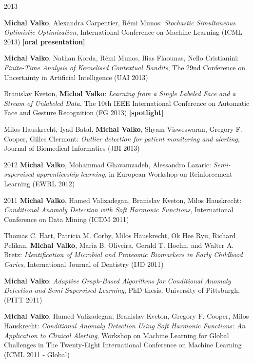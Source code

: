 \documentclass{resume}
\begin{document}
\begin{category}{2013}

\citembullet
{\bf Michal Valko}, Alexandra Carpentier, R\' emi Munos:
\emph{Stochastic Simultaneous Optimistic Optimization},
International Conference on Machine Learning
({\sf ICML 2013}) {\bf [oral presentation]}

\citembullet
{\bf Michal Valko}, Nathan Korda, R\' emi Munos, Ilias Flaounas, Nello 
Cristianini:
\emph{Finite-Time Analysis of Kernelised Contextual Bandits},
The 29nd Conference on Uncertainty in Artificial Intelligence
({\sf UAI 2013})

\citembullet
Branislav Kveton, {\bf Michal Valko}:
\emph{Learning from a Single Labeled Face and a Stream of Unlabeled Data},
The 10th IEEE International Conference on Automatic Face and Gesture Recognition
({\sf FG 2013})
{\bf [spotlight]}

\citembullet
Milos Hauskrecht, Iyad Batal, {\bf Michal Valko}, Shyam Visweswaran,
Gregory F. Cooper, Gilles Clermont: \emph{Outlier detection for patient
monitoring and alerting}, Journal of Biomedical Informatics ({\sf JBI 2013})


\end{category}
\begin{category}{2012}
\citembullet
{\bf Michal Valko}, Mohammad Ghavamzadeh, Alessandro Lazaric:
\emph{Semi-supervised apprenticeship learning}, in European Workshop on
Reinforcement Learning
({\sf EWRL 2012})

\end{category}
\begin{category}{2011}
\citembullet
{\bf Michal Valko}, Hamed Valizadegan, Branislav Kveton, Milos Hauskrecht:
\emph{Conditional Anomaly Detection with Soft Harmonic Functions},
International Conference on Data Mining ({\sf ICDM 2011}) 

\citembullet  
Thomas C. Hart, Patricia M. Corby, Milos Hauskrecht, Ok Hee Ryu, Richard Pelikan, {\bf Michal Valko}, Maria B. Oliveira, Gerald T. Hoehn, and Walter A. Bretz: \emph{Identification of Microbial and Proteomic Biomarkers in Early Childhood Caries}, International Journal of Dentistry ({\sf IJD 2011}) 

\citembullet  
{\bf Michal Valko}: 
\emph {Adaptive Graph-Based Algorithms for Conditional Anomaly Detection and Semi-Supervised Learning}, 
PhD thesis, University of Pittsburgh, ({\sf PITT 2011}) 

\citembullet
{\bf Michal Valko}, Hamed Valizadegan, Branislav Kveton, Gregory F. Cooper, Milos Hauskrecht:
\emph{Conditional Anomaly Detection Using Soft Harmonic Functions: An Application to Clinical Alerting}, Workshop on Machine Learning for Global Challenges in The Twenty-Eight International Conference on
Machine Learning ({\sf ICML 2011 - Global})
\end{category}
\end{document}
